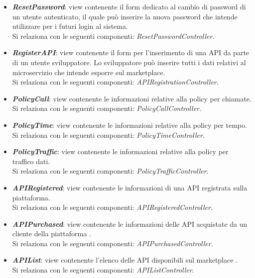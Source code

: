 \begin{itemize}
\begin{itemize}
		\item \textbf{\textit{ResetPassword}}: view contenente il form dedicato al cambio di password di un utente autenticato, il quale può inserire la nuova password che intende utilizzare per i futuri login al sistema.\\
		Si relaziona con le seguenti componenti: \textit{ResetPasswordController}.
		
		\item \textbf{\textit{RegisterAPI}}: view contenente il form per l'inserimento di una API da parte di un utente sviluppatore. Lo sviluppatore può inserire tutti i dati relativi al microservizio che intende esporre sul marketplace.\\
		Si relaziona con le seguenti componenti: \textit{APIRegistrationController}.
		
		\item \textbf{\textit{PolicyCall}}: view contenente le informazioni relative alla policy per chiamate.\\
		Si relaziona con le seguenti componenti: \textit{PolicyCallController}.
		
		\item \textbf{\textit{PolicyTime}}: view contenente le informazioni relative alla policy per tempo.\\
		Si relaziona con le seguenti componenti: \textit{PolicyTimeController}.
		
		\item \textbf{\textit{PolicyTraffic}}: view contenente le informazioni relative alla policy per traffico dati.\\
		Si relaziona con le seguenti componenti: \textit{PolicyTrafficController}.
		
		\item \textbf{\textit{APIRegistered}}: view contenente le informazioni di una API registrata sulla piattaforma.\\
		Si relaziona con le seguenti componenti: \textit{APIRegisteredController}.
		
		\item \textbf{\textit{APIPurchased}}: view contenente le informazioni delle API acquistate da un cliente della piattaforma \progetto.\\
		Si relaziona con le seguenti componenti: \textit{APIPurchasedController}.
		
		\item \textbf{\textit{APIList}}: view contenente l'elenco delle API disponibili sul marketplace \progetto.\\
		Si relaziona con le seguenti componenti: \textit{APIListController}.
		

\end{itemize}
\end{itemize}
